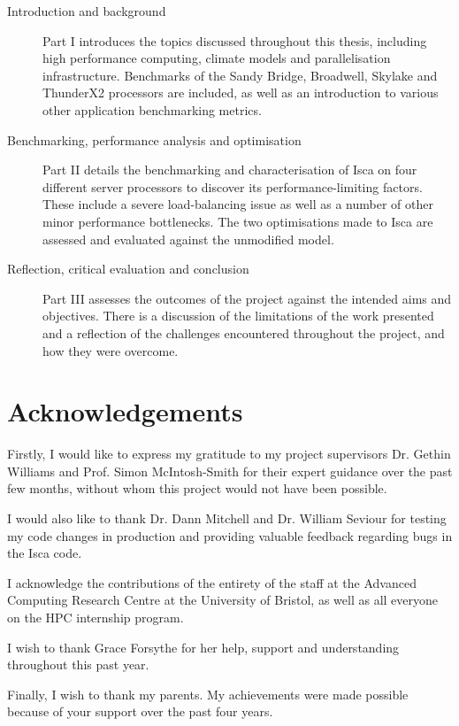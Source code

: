 \documentclass[a4paper,11pt]{report}
\begin{document}
\begin{description}

	\item[Introduction and background] Part I introduces the topics discussed throughout this thesis, including high performance computing, climate models and parallelisation infrastructure. Benchmarks of the Sandy Bridge, Broadwell, Skylake and ThunderX2 processors are included, as well as an introduction to various other application benchmarking metrics. 
	
	\item[Benchmarking, performance analysis and optimisation] Part II details the benchmarking and characterisation of Isca on four different server processors to discover its performance-limiting factors. These include a severe load-balancing issue as well as a number of other minor performance bottlenecks. The two optimisations made to Isca are assessed and evaluated against the unmodified model. 
	
	\item[Reflection, critical evaluation and conclusion] Part III assesses the outcomes of the project against the intended aims and objectives. There is a discussion of the limitations of the work presented and a reflection of the challenges encountered throughout the project, and how they were overcome.
\end{description}

  

\chapter*{Acknowledgements}
Firstly, I would like to express my gratitude to my project supervisors Dr. Gethin Williams and Prof. Simon McIntosh-Smith for their expert guidance over the past few months, without whom this project would not have been possible. 
\par
I would also like to thank Dr. Dann Mitchell and Dr. William Seviour for testing my code changes in production and providing valuable feedback regarding bugs in the Isca code. 
\par
I acknowledge the contributions of the entirety of the staff at the Advanced Computing Research Centre at the University of Bristol, as well as all everyone on the HPC internship program. 
\par
I wish to thank Grace Forsythe for her help, support and understanding throughout this past year.
\par
Finally, I wish to thank my parents. My achievements were made possible because of your support over the past four years. 
\end{document}
